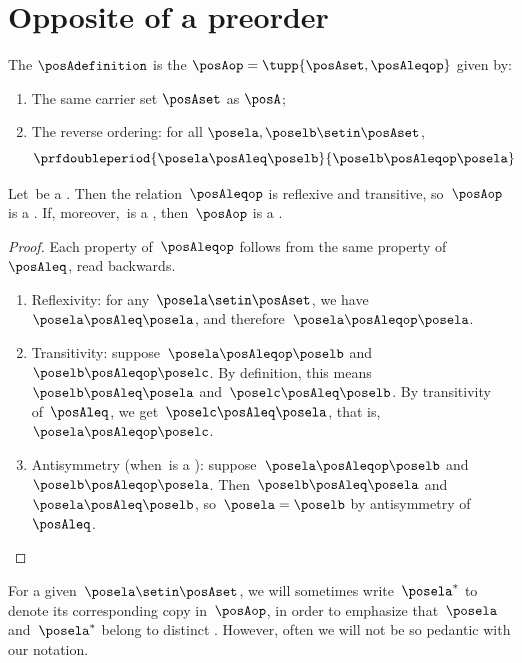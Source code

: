 
\section{Opposite of a preorder}\label{sec:opposite-of-a-poset}


\begin{ctdefinition}
    \label{def:poset-opposite}
    The  $\posAdefinition$ is the  $\posAop=\tupp{\posAset, \posAleqop}$ given by:

    \constit
    \begin{enumerate}
        \item The same carrier set $\posAset$ as $\posA$;
        \item The reverse ordering: for all $\posela,\poselb \setin \posAset$,
              \begin{equation}\label{eq:poset-opposite}
                  \prfdoubleperiod{
                      \posela \posAleq \poselb
                  }{
                      \poselb \posAleqop \posela
                  }
              \end{equation}
    \end{enumerate}
\end{ctdefinition}

\begin{lemma}
    \label{lem:opposite-preorder}
    Let~\posA be a .
    Then the relation~$\posAleqop$ is reflexive and transitive, so~$\posAop$ is a .
    If, moreover,~\posA is a , then~$\posAop$ is a .
\end{lemma}
\begin{proof}
    Each property of~$\posAleqop$ follows from the same property of~$\posAleq$, read backwards.
    \begin{enumerate}
        \item Reflexivity: for any~$\posela \setin \posAset$, we have~$\posela \posAleq \posela$, and therefore~$\posela \posAleqop \posela$.
        \item Transitivity: suppose~$\posela \posAleqop \poselb$ and~$\poselb \posAleqop \poselc$.
        By definition, this means~$\poselb \posAleq \posela$ and~$\poselc \posAleq \poselb$.
        By transitivity of~$\posAleq$, we get~$\poselc \posAleq \posela$, that is,~$\posela \posAleqop \poselc$.
        \item Antisymmetry (when~\posA is a ): suppose~$\posela \posAleqop \poselb$ and~$\poselb \posAleqop \posela$.
        Then~$\poselb \posAleq \posela$ and~$\posela \posAleq \poselb$, so~$\posela = \poselb$ by antisymmetry of~$\posAleq$.
    \end{enumerate}
\end{proof}
For a given~$\posela \setin \posAset$, we will sometimes write~$\posela^*$ to denote its corresponding copy in~$\posAop$, in order to emphasize that~$\posela$ and~$\posela^*$ belong to distinct .
However, often we will not be so pedantic with our notation.

